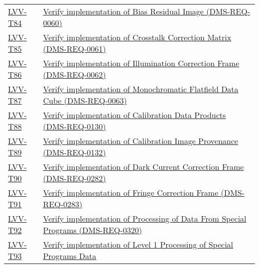 \begin{longtable}[]{@{}ll@{}}
\protect\hyperlink{lvv-t84---verify-implementation-of-bias-residual-image-dms-req-0060}{LVV-T84}
&
\href{https://jira.lsstcorp.org/secure/Tests.jspa\#/testCase/LVV-T84}{Verify
implementation of Bias Residual Image (DMS-REQ-0060)}\tabularnewline
\protect\hyperlink{lvv-t85---verify-implementation-of-crosstalk-correction-matrix-dms-req-0061}{LVV-T85}
&
\href{https://jira.lsstcorp.org/secure/Tests.jspa\#/testCase/LVV-T85}{Verify
implementation of Crosstalk Correction Matrix
(DMS-REQ-0061)}\tabularnewline
\protect\hyperlink{lvv-t86---verify-implementation-of-illumination-correction-frame-dms-req-0062}{LVV-T86}
&
\href{https://jira.lsstcorp.org/secure/Tests.jspa\#/testCase/LVV-T86}{Verify
implementation of Illumination Correction Frame
(DMS-REQ-0062)}\tabularnewline
\protect\hyperlink{lvv-t87---verify-implementation-of-monochromatic-flatfield-data-cube-dms-req-0063}{LVV-T87}
&
\href{https://jira.lsstcorp.org/secure/Tests.jspa\#/testCase/LVV-T87}{Verify
implementation of Monochromatic Flatfield Data Cube
(DMS-REQ-0063)}\tabularnewline
\protect\hyperlink{lvv-t88---verify-implementation-of-calibration-data-products-dms-req-0130}{LVV-T88}
&
\href{https://jira.lsstcorp.org/secure/Tests.jspa\#/testCase/LVV-T88}{Verify
implementation of Calibration Data Products
(DMS-REQ-0130)}\tabularnewline
\protect\hyperlink{lvv-t89---verify-implementation-of-calibration-image-provenance-dms-req-0132}{LVV-T89}
&
\href{https://jira.lsstcorp.org/secure/Tests.jspa\#/testCase/LVV-T89}{Verify
implementation of Calibration Image Provenance
(DMS-REQ-0132)}\tabularnewline
\protect\hyperlink{lvv-t90---verify-implementation-of-dark-current-correction-frame-dms-req-0282}{LVV-T90}
&
\href{https://jira.lsstcorp.org/secure/Tests.jspa\#/testCase/LVV-T90}{Verify
implementation of Dark Current Correction Frame
(DMS-REQ-0282)}\tabularnewline
\protect\hyperlink{lvv-t91---verify-implementation-of-fringe-correction-frame-dms-req-0283}{LVV-T91}
&
\href{https://jira.lsstcorp.org/secure/Tests.jspa\#/testCase/LVV-T91}{Verify
implementation of Fringe Correction Frame (DMS-REQ-0283)}\tabularnewline
\protect\hyperlink{lvv-t92---verify-implementation-of-processing-of-data-from-special-programs-dms-req-0320}{LVV-T92}
&
\href{https://jira.lsstcorp.org/secure/Tests.jspa\#/testCase/LVV-T92}{Verify
implementation of Processing of Data From Special Programs
(DMS-REQ-0320)}\tabularnewline
\protect\hyperlink{lvv-t93---verify-implementation-of-level-1-processing-of-special-programs-data-dms-req-0321}{LVV-T93}
&
\href{https://jira.lsstcorp.org/secure/Tests.jspa\#/testCase/LVV-T93}{Verify
implementation of Level 1 Processing of Special Programs Data
}
\end{longtable}
